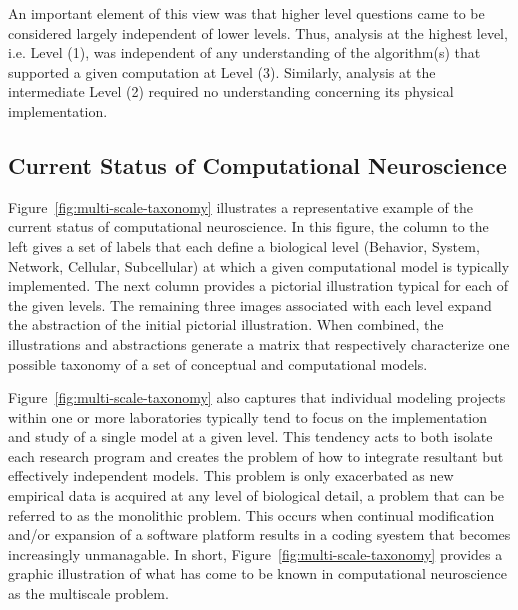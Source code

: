 \documentclass[11pt,3p,twocolumn]{JMN}
\begin{document}
An important element of this view was that higher level questions came to be considered largely independent of lower levels. Thus, analysis at the highest level, i.e. Level (1), was independent of any understanding of the algorithm(s) that supported a given computation at Level (3). Similarly, analysis at the intermediate Level (2) required no understanding concerning its physical implementation. 

\subsection{Current Status of Computational Neuroscience}

Figure~\ref{fig:multi-scale-taxonomy} illustrates a representative example of the current status of computational neuroscience. In this figure, the column to the left gives a set of labels that each define a biological level (Behavior, System, Network, Cellular, Subcellular) at which a given computational model is typically implemented. The next column provides a pictorial illustration typical for each of the given levels. The remaining three images associated with each level expand the abstraction of the initial pictorial illustration. When combined, the illustrations and abstractions generate a matrix that respectively characterize one possible taxonomy of a set of conceptual and computational models.

Figure~\ref{fig:multi-scale-taxonomy} also captures that individual modeling projects within one or more laboratories typically tend to focus on the implementation and study of a single model at a given level. This tendency acts to both isolate each research program and creates the problem of how to integrate resultant but effectively independent models. This problem is only exacerbated as new empirical data is acquired at any level of biological detail, a problem that can be referred to as the monolithic problem. This occurs when continual modification and/or expansion of a software platform results in a coding syestem that becomes increasingly unmanagable. In short, Figure~\ref{fig:multi-scale-taxonomy} provides a graphic illustration of what has come to be known in computational neuroscience as the multiscale problem.
\end{document}
